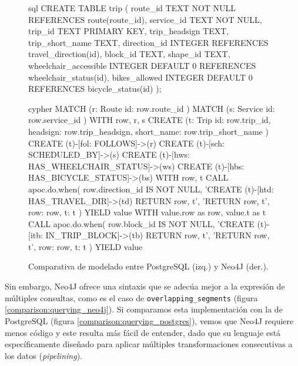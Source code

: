 \begin{figure}[ht]
    \centering
    \begin{minipage}[t]{0.49\linewidth}
        \vspace{0px}
        \begin{huggedminted}[fontsize=\scriptsize]{sql}
CREATE TABLE trip (
    route_id TEXT NOT NULL
        REFERENCES route(route_id),
    service_id TEXT NOT NULL,
    trip_id TEXT PRIMARY KEY,
    trip_headsign TEXT,
    trip_short_name TEXT,
    direction_id INTEGER
        REFERENCES travel_direction(id),
    block_id TEXT,
    shape_id TEXT,
    wheelchair_accessible INTEGER
        DEFAULT 0
        REFERENCES wheelchair_status(id),
    bikes_allowed INTEGER
        DEFAULT 0
        REFERENCES bicycle_status(id)
);
        \end{huggedminted}
    \end{minipage}%
    \begin{minipage}[t]{0.49\linewidth}
        \vspace{0px}
        \begin{huggedminted}[fontsize=\scriptsize]{cypher}
MATCH (r: Route { id: row.route_id })
MATCH (s: Service { id: row.service_id })
WITH row, r, s
CREATE (t: Trip {
    id: row.trip_id,
    headsign: row.trip_headsign,
    short_name: row.trip_short_name
})
CREATE (t)-[fol: FOLLOWS]->(r)
CREATE (t)-[sch: SCHEDULED_BY]->(s)
CREATE (t)-[hws: HAS_WHEELCHAIR_STATUS]->(ws)
CREATE (t)-[hbs: HAS_BICYCLE_STATUS]->(bs)
WITH row, t
CALL apoc.do.when(
    row.direction_id IS NOT NULL,
    'CREATE (t)-[htd: HAS_TRAVEL_DIR]->(td)
    RETURN row, t',
    'RETURN row, t',
    { row: row, t: t }
) YIELD value
WITH value.row as row, value.t as t
CALL apoc.do.when(
    row.block_id IS NOT NULL,
    'CREATE (t)-[itb: IN_TRIP_BLOCK]->(tb)
    RETURN row, t',
    'RETURN row, t',
    { row: row, t: t }
) YIELD value
        \end{huggedminted}
    \end{minipage}
    \caption{Comparativa de modelado entre PostgreSQL (izq.) y Neo4J (der.).}
    \label{comparison:modeling}
\end{figure}

Sin embargo, Neo4J ofrece una sintaxis que se adecúa mejor a la expresión de múltiples consultas, como es el caso de \texttt{overlapping\_segments} (figura \ref{comparison:querying_neo4j}). Si comparamos esta implementación con la de PostgreSQL (figura \ref{comparison:querying_postgres}), vemos que Neo4J requiere menos código y este resulta más fácil de entender, dado que su lenguaje está específicamente diseñado para aplicar múltiples transformaciones consecutivas a los datos (\textit{pipelining}).

